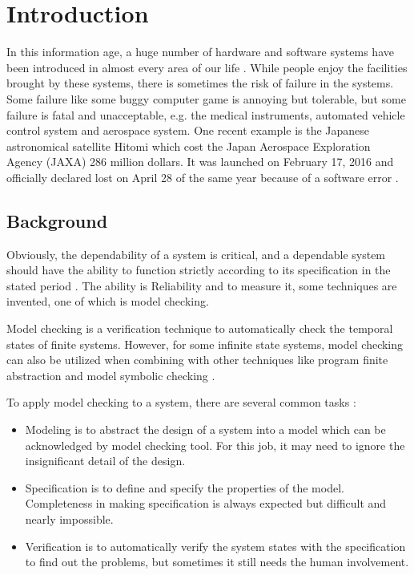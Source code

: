 
\chapter{Introduction}

In this information age, a huge number of hardware and software systems have been introduced in almost every area of our life \citep{clarke1999model}. While people enjoy the facilities brought by these systems, there is sometimes the risk of failure in the systems. Some failure like some buggy computer game is annoying but tolerable, but some failure is fatal and unacceptable, e.g. the medical instruments, automated vehicle control system and aerospace system. One recent example is the Japanese astronomical satellite Hitomi which cost the Japan Aerospace Exploration Agency (JAXA) 286 million dollars. It was launched on February 17, 2016 and officially declared lost on April 28 of the same year because of a software error \citep{nature2016}.

\section{Background}

Obviously, the dependability of a system is critical, and a dependable system should have the ability to function strictly according to its specification in the stated period \citep{avivzienis2004basic}. The ability is Reliability and to measure it, some techniques are invented, one of which is model checking.

Model checking is a verification technique to automatically check the temporal states of finite systems. However, for some infinite state systems, model checking can also be utilized when combining with other techniques like program finite abstraction and model symbolic checking \citep{bultan1997symbolic}.

To apply model checking to a system, there are several common tasks \citep{clarke1999model}:
\begin{itemize}
\item Modeling is to abstract the design of a system into a model which can be acknowledged by model checking tool. For this job, it may need to ignore the insignificant detail of the design.
\item Specification is to define and specify the properties of the model. Completeness in making specification is always expected but difficult and nearly impossible.
\item Verification is to automatically verify the system states with the specification to find out the problems, but sometimes it still needs the human involvement.
\end{itemize}

